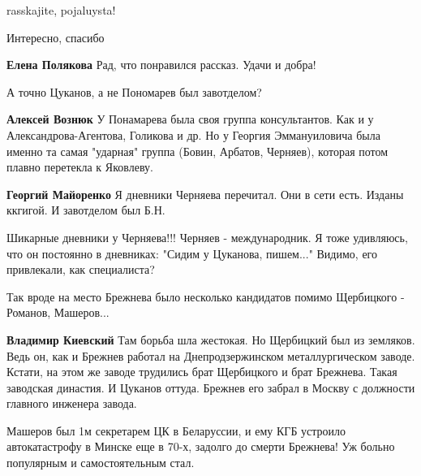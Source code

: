 \begin{itemize}
\begin{itemize}
rasskajite, pojaluysta!

\end{itemize} %

Интересно, спасибо

\begin{itemize} %
\textbf{Елена Полякова} Рад, что понравился рассказ. Удачи и добра!
\end{itemize} %

А точно Цуканов, а не Пономарев был завотделом?

\begin{itemize} %
\textbf{Алексей Вознюк} У Понамарева была своя группа консультантов. Как и у Александрова-Агентова, Голикова и др. Но у Георгия Эммануиловича была именно та самая "ударная" группа (Бовин, Арбатов, Черняев), которая потом плавно перетекла к Яковлеву.

\begin{itemize} %
\textbf{Георгий Майоренко} Я дневники Черняева перечитал. Они в сети есть. Изданы ккгигой. И завотделом был Б.Н.


Шикарные дневники у Черняева!!! Черняев - международник. Я тоже удивляюсь, что
он постоянно в дневниках: "Сидим у Цуканова, пишем..." Видимо, его привлекали,
как специалиста?

\end{itemize} %

\end{itemize} %


Так вроде на место Брежнева было несколько кандидатов помимо Щербицкого -
Романов, Машеров...

\begin{itemize} %
\textbf{Владимир Киевский} Там борьба шла жестокая. Но Щербицкий был из земляков. Ведь он, как и Брежнев работал на Днепродзержинском металлургическом заводе. Кстати, на этом же заводе трудились брат Щербицкого и брат Брежнева. Такая заводская династия. И Цуканов оттуда. Брежнев его забрал в Москву с должности главного инженера завода.

Машеров был 1м секретарем ЦК в Беларуссии, и ему КГБ устроило автокатастрофу в Минске еще в 70-х, задолго до смерти Брежнева! Уж больно популярным и самостоятельным стал.


\end{itemize}
\end{itemize}

